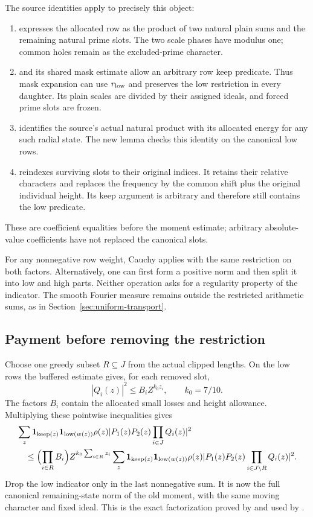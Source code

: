 The source identities apply to precisely this object:
\begin{enumerate}
\item {}
expresses the allocated row as the product of two natural plain sums and
the remaining natural prime slots. The two scale phases have modulus one;
common holes remain as the excluded-prime character.
\item {} and its shared mask estimate
allow an arbitrary row keep predicate. Thus mask expansion can use
$r_{\rm low}$ and preserves the low restriction in every daughter.
Its plain scales are divided by their assigned ideals, and forced prime
slots are frozen.
\item {} identifies the
source's actual natural product with its allocated energy for any such
radial state. The new  lemma
checks this identity on the canonical low rows.
\item {} reindexes
surviving slots to their original indices. It retains their relative
characters and replaces the frequency by the common shift plus the
original individual height. Its keep argument is arbitrary and therefore
still contains the low predicate.
\end{enumerate}
These are coefficient equalities before the moment estimate; arbitrary
absolute-value coefficients have not replaced the canonical slots.

For any nonnegative row weight, Cauchy applies with the same restriction
on both factors. Alternatively, one can first form a positive norm and
then split it into low and high parts. Neither operation asks for a
regularity property of the indicator. The smooth Fourier measure remains
outside the restricted arithmetic sums, as in
Section~\ref{sec:uniform-transport}.

\subsection{Payment before removing the restriction}
Choose one greedy subset $R\subseteq J$ from the actual clipped lengths.
On the low rows the buffered estimate gives, for each removed slot,
\[
 |Q_i(z)|^2\le B_i Z^{k_0z_i},\qquad k_0=7/10.
\]
The factors $B_i$ contain the allocated small losses and height allowance.
Multiplying these pointwise inequalities gives
\begin{align*}
 &\sum_z\mathbf1_{\mathrm{keep}(z)}\mathbf1_{\mathrm{low}(w(z))}
   \rho(z)|P_1(z)P_2(z)\prod_{i\in J}Q_i(z)|^2\\
 &\quad\le\Bigl(\prod_{i\in R}B_i\Bigr)Z^{k_0\sum_{i\in R}z_i}
   \sum_z\mathbf1_{\mathrm{keep}(z)}\mathbf1_{\mathrm{low}(w(z))}
   \rho(z)|P_1(z)P_2(z)\prod_{i\in J\setminus R}Q_i(z)|^2.
\end{align*}
Drop the low indicator only in the last nonnegative sum. It is now the
full canonical remaining-state norm of the old moment, with the same
moving character and fixed ideal. This is the exact factorization proved
by  and used by
.


